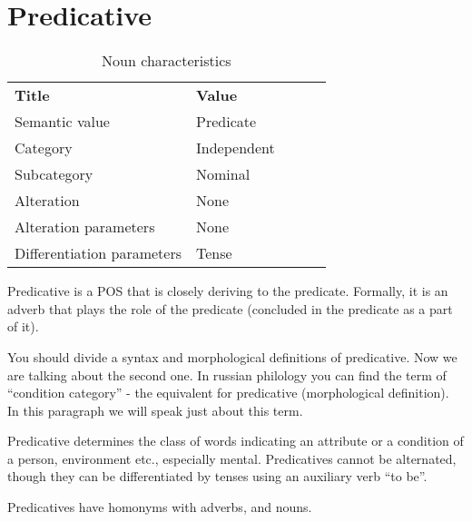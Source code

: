 \section{Predicative}

\begin{table}[h]
	\caption{Noun characteristics}
	\begin{tabular}{lllll}
		\textbf{Title}              & \textbf{Value}                            \\
		Semantic value              & Predicate                                 \\
		Category                    & Independent                               \\
		Subcategory                 & Nominal                                   \\
		Alteration                  & None                                      \\
		Alteration parameters       & None                                      \\
		Differentiation parameters  & Tense                                  
	\end{tabular}
\end{table}

Predicative is a POS that is closely deriving to the predicate. Formally, it is an adverb that plays the role of the predicate (concluded in the predicate as a part of it). 

You should divide a syntax and morphological definitions of predicative. Now we are talking about the second one. In russian philology you can find the term of “condition category” - the equivalent for predicative (morphological definition). In this paragraph we will speak just about this term.

Predicative determines the class of words indicating an attribute or a condition of a person, environment etc., especially mental. Predicatives cannot be alternated, though they can be differentiated by tenses using an auxiliary verb “to be”. 

Predicatives have homonyms with adverbs, and nouns.  
